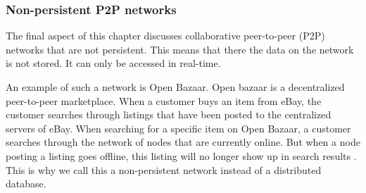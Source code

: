 \subsubsection{Non-persistent P2P networks}

The final aspect of this chapter discusses collaborative peer-to-peer (P2P) networks that are not persistent. This means that there the data on the network is not stored. It can only be accessed in real-time. 

An example of such a network is Open Bazaar. Open bazaar is a decentralized peer-to-peer marketplace. When a customer buys an item from eBay, the customer searches through listings that have been posted to the centralized servers of eBay. When searching for a specific item on Open Bazaar, a customer searches through the network of nodes that are currently online. But when a node posting a listing goes offline, this listing will no longer show up in search results \cite{openbazaar-faq}. This is why we call this a non-persistent network instead of a distributed database.


